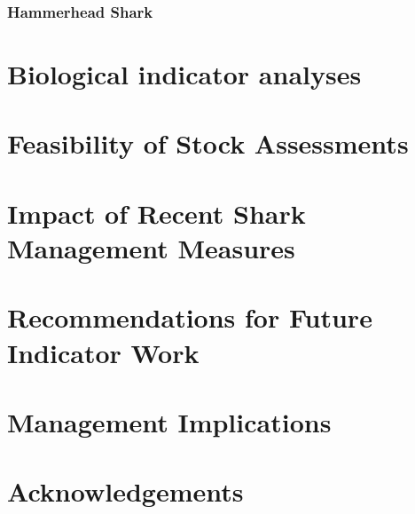      \subsubsection{Hammerhead Shark}
          
      
   
 \clearpage     
      
      
      
      
     
      
\section{Biological indicator analyses}
     
      
         
      
\section{Feasibility of Stock Assessments}
\section{Impact of Recent Shark Management Measures}

\section{Recommendations for Future Indicator Work}
\section{Management Implications}

\section*{Acknowledgements}
\clearpage


